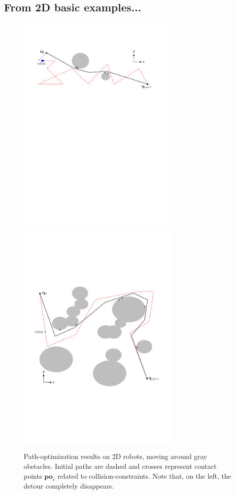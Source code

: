 \documentclass{tADR2e}
\newcommand\po{\mathbf{po}}
\begin{document}
\subsection{From 2D basic examples...}

\begin{figure}
	\centering
	\includegraphics[width=7.8cm]{contact_points6.pdf}
	\includegraphics[width=8cm]{contact_points2potential.pdf}
	\caption{Path-optimization results on 2D robots, moving around 
	gray obstacles. Initial paths are dashed and crosses represent contact points 
	$\po_c$ related to collision-constraints. Note that, on the left, the detour 
	completely disappears.}
	\label{2D_long}
\end{figure}
\end{document}
